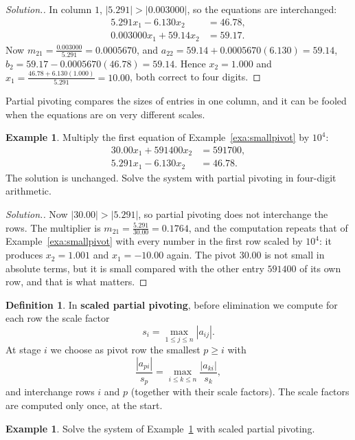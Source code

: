\documentclass[11pt,a4paper]{article}
\numberwithin{equation}{section}
\theoremstyle{definition}
\newtheorem{defn}[thm]{Definition}
\newtheorem{exa}[thm]{Example}
\newenvironment{solution}
  {\renewcommand{\qedsymbol}{}\begin{proof}[\textit{Solution}.]}
  {\end{proof}}
\begin{document}
\begin{solution}
In column $1$, $|5.291|>|0.003000|$, so the equations are interchanged:
\begin{align*}
5.291x_1-6.130x_2 &= 46.78,\\
0.003000x_1+59.14x_2 &= 59.17 .
\end{align*}
Now $m_{21} = \frac{0.003000}{5.291} = 0.0005670$, and $a_{22} = 59.14+0.0005670(6.130) = 59.14$, $b_2 = 59.17-0.0005670(46.78) =
59.14$. Hence $x_2 = 1.000$ and $x_1 = \frac{46.78+6.130(1.000)}{5.291} = 10.00$, both correct to four digits.
\end{solution}

Partial pivoting compares the sizes of entries in one column, and it can be fooled when the equations are on very different scales.

\begin{exa}
\label{exa:scaledpivot}
Multiply the first equation of Example~\ref{exa:smallpivot} by $10^4$:
\begin{align*}
30.00x_1+591400x_2 &= 591700,\\
5.291x_1-6.130x_2 &= 46.78 .
\end{align*}
The solution is unchanged. Solve the system with partial pivoting in four-digit arithmetic.
\end{exa}

\begin{solution}
Now $|30.00|>|5.291|$, so partial pivoting does not interchange the rows. The multiplier is $m_{21} = \frac{5.291}{30.00} = 0.1764$, and the
computation repeats that of Example~\ref{exa:smallpivot} with every number in the first row scaled by $10^4$: it produces $x_2 = 1.001$
and $x_1 = -10.00$ again. The pivot $30.00$ is not small in absolute terms, but it is small compared with the other entry $591400$ of its
own row, and that is what matters.
\end{solution}

\begin{defn}
In \textbf{scaled partial pivoting}, before elimination we compute for each row the scale factor
$$s_i = \max_{1\leq j\leq n}|a_{ij}| .$$
At stage $i$ we choose as pivot row the smallest $p\geq i$ with
$$\frac{|a_{pi}|}{s_p} = \max_{i\leq k\leq n}\frac{|a_{ki}|}{s_k},$$
and interchange rows $i$ and $p$ (together with their scale factors). The scale factors are computed only once, at the start.
\end{defn}

\begin{exa}
Solve the system of Example~\ref{exa:scaledpivot} with scaled partial pivoting.
\end{exa}
\end{document}
